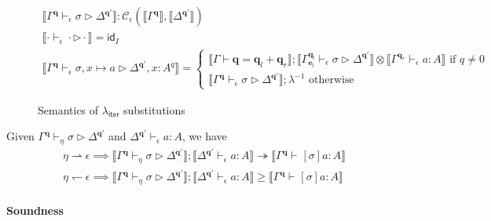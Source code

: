 \documentclass[acmsmall,screen,review]{acmart}
\newcommand{\mc}[1]{\ensuremath{\mathcal{#1}}}
\newcommand{\mb}[1]{\ensuremath{\mathbf{#1}}}
\newcommand{\ms}[1]{\ensuremath{\mathsf{#1}}}
\newcommand{\qsp}[4]{#1 \vdash #2 = #3 + #4}
\newcommand{\hasty}[4]{#1 \vdash_{#2} #3: {#4}}
\newcommand{\issubst}[4]{#1 \vdash_{#2} #3 \rhd #4}
\newcommand{\cref}{\twoheadrightarrow}
\newcommand{\dnt}[1]{\llbracket{#1}\rrbracket}
\newcommand{\subiterexp}{\texorpdfstring{\(\lambda_{\ms{iter}}\)}{lambda-iter}}
\newcommand{\rightmove}{\rightharpoonup}
\newcommand{\leftmove}{\leftharpoondown}
\begin{document}
\begin{figure}
  \begin{adjustbox}{minipage=1.1\textwidth,scale=0.9}
  \begin{gather*}
    \boxed{\dnt{\issubst{\Gamma^{\mb{q}}}{\epsilon}{\sigma}{\Delta^{\mb{q}'}}}
      : \mc{C}_\epsilon(\dnt{\Gamma^{\mb{q}}}, \dnt{\Delta^{\mb{q}'}})} \\
    \dnt{\issubst{\cdot}{\epsilon}{\cdot}{\cdot}} = \ms{id}_I
    \\
    \dnt{\issubst{\Gamma^{\mb{q}}}{\epsilon}{\sigma, x \mapsto a}{\Delta^{\mb{q}'}, x : A^q}}
    = \begin{cases}
      \dnt{\qsp{\Gamma}{\mb{q}}{\mb{q}_l}{\mb{q}_r}} 
      ; \dnt{\issubst{\Gamma^{\mb{q}_l}_{\mb{e}_l}}{\epsilon}{\sigma}{\Delta^{\mb{q}'}}}
      \otimes \dnt{\hasty{\Gamma^{\mb{q}_r}}{\epsilon}{a}{A}}
      \text{ if } q \neq 0 \\
      \dnt{\issubst{\Gamma^{\mb{q}}}{\epsilon}{\sigma}{\Delta^{\mb{q}'}}}
      ; \lambda^{-1} \text{ otherwise}
    \end{cases}
  \end{gather*}
  \end{adjustbox}
  \caption{Semantics of \subiterexp{} substitutions}
  \Description{}
  \label{fig:subst-den}
\end{figure}

\begin{theorem}
  Given $\issubst{\Gamma^{\mb{q}}}{\eta}{\sigma}{\Delta^{\mb{q'}}}$ and
  $\hasty{\Delta^{\mb{q}'}}{\epsilon}{a}{A}$, we have
  \begin{align*}
  \eta \rightmove \epsilon \implies
  \dnt{\issubst{\Gamma^{\mb{q}}}{\eta}{\sigma}{\Delta^{\mb{q'}}}} 
    ; \dnt{\hasty{\Delta^{\mb{q}'}}{\epsilon}{a}{A}}
  \cref \dnt{\hasty{\Gamma^{\mb{q}}}{}{[\sigma]a}{A}} \\
  \eta \leftmove \epsilon \implies
  \dnt{\issubst{\Gamma^{\mb{q}}}{\eta}{\sigma}{\Delta^{\mb{q'}}}} 
    ; \dnt{\hasty{\Delta^{\mb{q}'}}{\epsilon}{a}{A}}
  \geq \dnt{\hasty{\Gamma^{\mb{q}}}{}{[\sigma]a}{A}}
  \end{align*}
\end{theorem}

\paragraph{Soundness}
\end{document}
